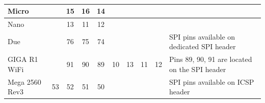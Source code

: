 {\begin{table}[h]
\begin{tabular}{
        | m{1.25cm}
        | c
        | c
        | c
        | c
        | c
        | c
        | c
        | c
        | m{1.75cm} |
      }
      \hline
      Micro
      &     & 15 & 16 & 14
      &     &    &    &
      & \\
      \hline
      Nano
      &     & 13 & 11 & 12
      &     &    &    &
      & \\
      \hline
      Due
      &     & 76 & 75 & 74
      &     &    &    &
      & SPI pins available on dedicated SPI header \\
      \hline
      GIGA R1 WiFi
      &     & 91 & 90 & 89
      &  10 & 13 & 11 & 12
      & Pins 89, 90, 91 are located on the SPI header \\
      \hline
      Mega 2560 Rev3
      &  53 & 52 & 51 & 50
      &     &    &    &
      & SPI pins available on ICSP header \\
      \hline
    \end{tabular}
    \caption{\tableCaption}
    \label{table:spi-ports}
  \end{table}
}
